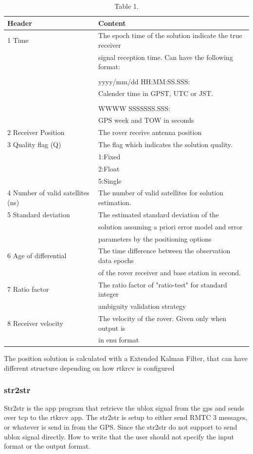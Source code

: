\begin{table}[!h]
\begin{center}
    \begin{tabular}{ | l | l |}
    \hline
    \textbf{Header} & \textbf{Content} \\ \hline
     1 Time & The epoch time of the solution indicate the true receiver\\& signal reception time. Can have the following format:\\&\\& yyyy/mm/dd HH:MM:SS.SSS:\\& Calender time in GPST, UTC or JST.\\&\\&
     
     WWWW SSSSSSS.SSS:\\&
     GPS week and TOW in seconds  \\ \hline
     2 Receiver Position & The rover receive antenna position \\ \hline
     3 Quality flag (Q) & The flag which indicates the solution quality.\\& 1:Fixed\\& 2:Float\\& 5:Single \\ \hline
     4 Number of valid satellites (ns) & The number of valid satellites for solution estimation. \\ \hline
     5 Standard deviation & The estimated standard deviation of the\\& solution assuming a priori error model and error\\& parameters by the positioning options \\ \hline
     6 Age of differential & The time difference between the observation data epochs\\& of the rover receiver and base station in second. \\ \hline
     7 Ratio factor & The ratio factor of "ratio-test" for standard integer\\& ambiguity validation strategy \\ \hline
     8 Receiver velocity & The velocity of the rover. Given only when output is\\& in enu format \\ \hline
    \end{tabular}
\end{center}
\caption{Table 1. }
\label{Tab1}
\end{table}
The position solution is calculated with a Extended Kalman Filter, that can have different structure depending on how rtkrcv is configured
\subsubsection{str2str}
Str2str is the app program that retrieve the ublox signal from the gps and sends over tcp to the rtkrcv app. The str2str is setup to either send RMTC 3 messages, or whatever is send in from the GPS. Since the str2str do not support to send ublox signal directly. How to write that the user should not specify the input format or the output format.



\cleardoublepage